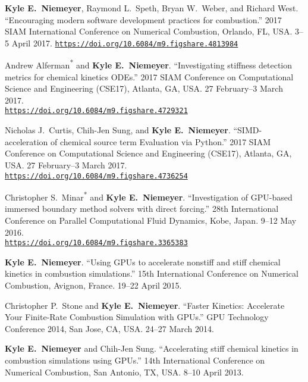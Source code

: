 \documentclass[margin,line,11pt]{res}
\makeatletter
\newlength{\bibhang}
\newlength{\bibsep}
 {\@listi \global\bibsep\itemsep \global\advance\bibsep by\parsep}
\newenvironment{bibenum*}
  {\renewcommand\labelenumi{\theenumi.}%
   \etaremune[
     topsep=0pt,
     itemsep=\bibsep,
     parsep=0pt,partopsep=0pt,
     itemindent=-\bibhang,
     leftmargin={\bibhang+\widthof{[999]}}]}
  {\endetaremune}
\newcommand*{\doi}[1]{\href{https://doi.org/#1}{\nolinkurl{https://doi.org/#1}}}
\makeatother
\begin{document}
\begin{resume}
\begin{bibenum*}
\item \textbf{Kyle E.~Niemeyer}, Raymond L.~Speth, Bryan W.~Weber, and Richard West.
``Encouraging modern software development practices for combustion.''
2017 SIAM International Conference on Numerical Combustion, Orlando, FL, USA.
3--5 April 2017.
\doi{10.6084/m9.figshare.4813984}

\item Andrew Alferman\textsuperscript{*} and \textbf{Kyle E.~Niemeyer}.
``Investigating stiffness detection metrics for chemical kinetics ODEs.''
2017 SIAM Conference on Computational Science and Engineering (CSE17), Atlanta, GA, USA.
27 February--3 March 2017. \\
\doi{10.6084/m9.figshare.4729321}

\item Nicholas J.~Curtis, Chih-Jen Sung, and \textbf{Kyle E.~Niemeyer}.
``SIMD-acceleration of chemical source term Evaluation via Python.''
2017 SIAM Conference on Computational Science and Engineering (CSE17), Atlanta, GA, USA.
27 February--3 March 2017. \\
\doi{10.6084/m9.figshare.4736254}

\item Christopher S.~Minar\textsuperscript{*} and \textbf{Kyle E.~Niemeyer}.
``Investigation of GPU-based immersed boundary method solvers with direct forcing.''
28th International Conference on Parallel Computational Fluid Dynamics, Kobe, Japan.
9--12 May 2016. \\
\doi{10.6084/m9.figshare.3365383}

\item \textbf{Kyle E.~Niemeyer}.
``Using GPUs to accelerate nonstiff and stiff chemical kinetics in combustion simulations.''
15th International Conference on Numerical Combustion, Avignon, France.
19--22 April 2015.

\item Christopher P.~Stone and \textbf{Kyle E.~Niemeyer}.
``Faster Kinetics: Accelerate Your Finite-Rate Combustion Simulation with GPUs.''
GPU Technology Conference 2014, San Jose, CA, USA.
24--27 March 2014.

\item \textbf{Kyle E.~Niemeyer} and Chih-Jen Sung.
``Accelerating stiff chemical kinetics in combustion simulations using GPUs.''
14th International Conference on Numerical Combustion, San Antonio, TX, USA.
8--10 April 2013.

\end{bibenum*}


\end{resume}
\end{document}
